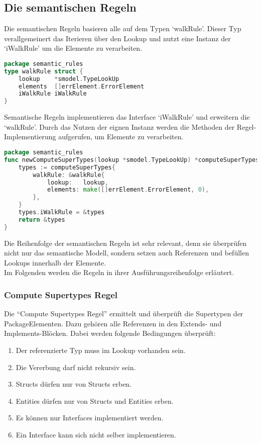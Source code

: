 \documentclass[./einleitung.tex]{subfiles}
\begin{document}
    \subsection{Die semantischen Regeln}\label{subsec:die-semantischen-regeln}
    Die semantischen Regeln basieren alle auf dem Typen `walkRule'.
    Dieser Typ verallgemeinert das Iterieren über den Lookup und nutzt eine Instanz der `iWalkRule' um die Elemente zu verarbeiten.
    \begin{lstlisting}[language=go]
package semantic_rules
type walkRule struct {
	lookup    *smodel.TypeLookUp
	elements  []errElement.ErrorElement
	iWalkRule iWalkRule
}
    \end{lstlisting}
    Semantische Regeln implementieren das Interface `iWalkRule' und erweitern die `walkRule'.
    Durch das Nutzen der eignen Instanz werden die Methoden der Regel-Implementierung aufgerufen, um Elemente zu verarbeiten.
    \begin{lstlisting}[language=go]
package semantic_rules
func newComputeSuperTypes(lookup *smodel.TypeLookUp) *computeSuperTypes {
	types := computeSuperTypes{
		walkRule: &walkRule{
			lookup:   lookup,
			elements: make([]errElement.ErrorElement, 0),
		},
	}
    types.iWalkRule = &types
    return &types
}\end{lstlisting}

    Die Reihenfolge der semantischen Regeln ist sehr relevant, denn sie überprüfen nicht nur das semantische Modell, sondern setzen auch Referenzen und befüllen Lookups innerhalb der Elemente. \\
    Im Folgenden werden die Regeln in ihrer Ausführungsreihenfolge erläutert.

    \subsubsection{Compute Supertypes Regel}
    Die ``Compute Supertypes Regel'' ermittelt und überprüft die Supertypen der PackageElementen.
    Dazu gehören alle Referenzen in den Extends- und Implements-Blöcken.
    Dabei werden folgende Bedingungen überprüft:
    \begin{enumerate}
        \item Der referenzierte Typ muss im Lookup vorhanden sein.
        \item Die Vererbung darf nicht rekursiv sein.
        \item Structs dürfen nur von Structs erben.
        \item Entities dürfen nur von Structs und Entities erben.
        \item Es können nur Interfaces implementiert werden.
        \item Ein Interface kann sich nicht selber implementieren.
    \end{enumerate}
\end{document}
